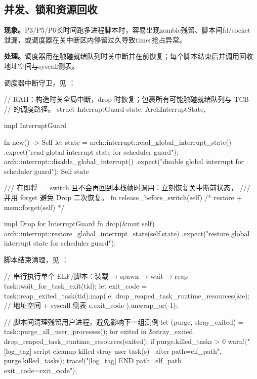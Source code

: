 \subsection{并发、锁和资源回收}

\textbf{现象。}P3/P5/P6长时间跑多进程脚本时，容易出现zombie残留、脚本间fd/socket泄漏，或调度器在关中断区内停留过久导致timer抢占异常。

\textbf{处理。}调度器用在触碰就绪队列时关中断并在前恢复；每个脚本结束后并调用回收地址空间与syscall侧表。

调度器中断守卫，见 ：

\begin{rustcode}
// RAII：构造时关全局中断，drop 时恢复；包裹所有可能触碰就绪队列与 TCB
// 的调度路径。
struct InterruptGuard {
    state: ArchInterruptState,
}

impl InterruptGuard {
    fn new() -> Self {
        let state = arch::interrupt::read_global_interrupt_state()
            .expect("read global interrupt state for scheduler guard");
        arch::interrupt::disable_global_interrupt()
            .expect("disable global interrupt for scheduler guard");
        Self { state }
    }

    /// 在即将 __switch 且不会再回到本栈帧时调用：立刻恢复关中断前状态，
    /// 并用 forget 避免 Drop 二次恢复。
    fn release_before_switch(self) { /* restore + mem::forget(self) */ }
}

impl Drop for InterruptGuard {
    fn drop(&mut self) {
        arch::interrupt::restore_global_interrupt_state(self.state)
            .expect("restore global interrupt state for scheduler guard");
    }
}
\end{rustcode}

脚本结束清理，见 ：

\begin{rustcode}
// 串行执行单个 ELF/脚本：装载 → spawn → wait → reap
task::wait_for_task_exit(tid);
let exit_code = task::reap_exited_task(tid).map(|e| {
    drop_reaped_task_runtime_resources(&e);  // 地址空间 + syscall 侧表
    e.exit_code
}).unwrap_or(-1);

// 脚本间清理残留用户进程，避免影响下一组测例
let (purge, stray_exited) = task::purge_all_user_processes();
for exited in &stray_exited {
    drop_reaped_task_runtime_resources(exited);
}
if purge.killed_tasks > 0 {
    warn!("[{log_tag}] script cleanup killed {} stray user task(s) \
           after path={elf_path}", purge.killed_tasks);
}
trace!("[{log_tag}] END path={elf_path} exit_code={exit_code}");
\end{rustcode}

